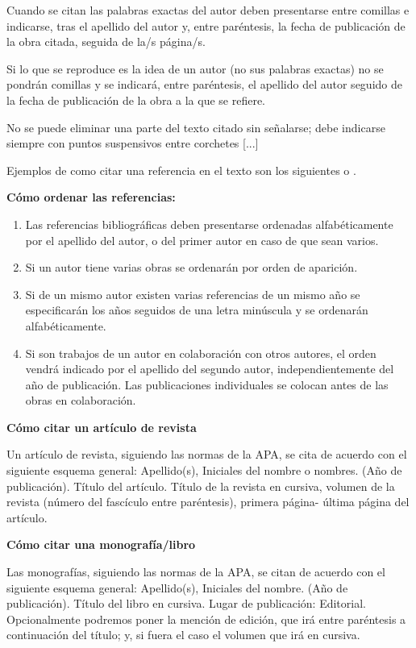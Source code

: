 \documentclass[spanish,12pt, a4paper, twoside]{paper}
\begin{document}
Cuando se citan las palabras exactas del autor deben presentarse entre comillas e indicarse, tras el apellido del autor y, entre paréntesis, la fecha de publicación de la obra citada, seguida de la/s página/s.

Si lo que se reproduce es la idea de un autor (no sus palabras exactas) no se pondrán comillas y se indicará, entre paréntesis, el apellido del autor seguido de la fecha de publicación de la obra a la que se refiere.

No se puede eliminar una parte del texto citado sin señalarse; debe indicarse siempre con puntos suspensivos entre corchetes [...]

Ejemplos de como citar una referencia en el texto son los siguientes \cite{Ashtiani2014} o \cite{Ashtiani2014,Mateos2009,Vicente2016}.


\bigskip
{\bf Cómo ordenar las referencias:}
\begin{enumerate}
\item Las referencias bibliográficas deben presentarse ordenadas alfabéticamente por el apellido del autor, o del primer autor en caso de que sean varios.
\item Si un autor tiene varias obras se ordenarán por orden de aparición.
\item Si de un mismo autor existen varias referencias de un mismo año se especificarán los años seguidos de una letra minúscula y se ordenarán alfabéticamente.
\item Si son trabajos de un autor en colaboración con otros autores, el orden vendrá indicado por el apellido del segundo autor, independientemente del año de publicación. Las publicaciones individuales se colocan antes de las obras en colaboración.
\end{enumerate}

\bigskip
{\bf Cómo citar un artículo de revista}

Un artículo de revista, siguiendo las normas de la APA, se cita de acuerdo con el siguiente esquema general:
Apellido(s), Iniciales del nombre o nombres. (Año de publicación). Título del artículo. Título de la revista en cursiva, volumen de la revista (número del fascículo entre paréntesis), primera página- última página del artículo.

\bigskip
{\bf Cómo citar una monografía/libro}

Las monografías, siguiendo las normas de la APA, se citan de acuerdo con el siguiente esquema general:
Apellido(s), Iniciales del nombre. (Año de publicación). Título del libro en cursiva. Lugar de publicación: Editorial.
Opcionalmente podremos poner la mención de edición, que irá entre paréntesis a continuación del título; y, si fuera el caso el volumen que irá en cursiva.
\end{document}
